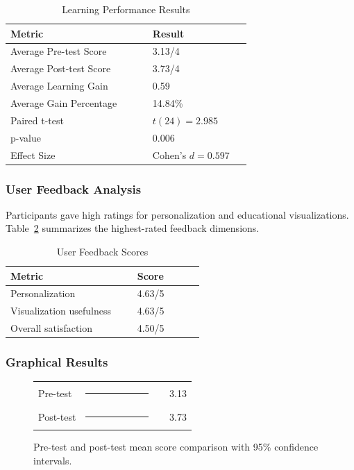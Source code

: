 \documentclass[conference]{IEEEtran}
\begin{document}
\begin{table}[htbp]
\caption{Learning Performance Results}
\label{tab:learning-performance}
\centering
\begin{tabular}{p{0.52\linewidth}p{0.36\linewidth}}
\toprule
\textbf{Metric} & \textbf{Result} \\
\midrule
Average Pre-test Score & 3.13/4 \\
Average Post-test Score & 3.73/4 \\
Average Learning Gain & 0.59 \\
Average Gain Percentage & 14.84\% \\
Paired t-test & $t(24)=2.985$ \\
p-value & 0.006 \\
Effect Size & Cohen's $d=0.597$ \\
\bottomrule
\end{tabular}
\end{table}

\subsubsection{User Feedback Analysis}

Participants gave high ratings for personalization and educational visualizations. Table~\ref{tab:user-feedback} summarizes the highest-rated feedback dimensions.

\begin{table}[htbp]
\caption{User Feedback Scores}
\label{tab:user-feedback}
\centering
\begin{tabular}{p{0.58\linewidth}p{0.30\linewidth}}
\toprule
\textbf{Metric} & \textbf{Score} \\
\midrule
Personalization & 4.63/5 \\
Visualization usefulness & 4.63/5 \\
Overall satisfaction & 4.50/5 \\
\bottomrule
\end{tabular}
\end{table}

\subsubsection{Graphical Results}

\begin{figure}[htbp]
\centering
\scriptsize
\begin{tabular}{@{}p{0.30\linewidth}p{0.46\linewidth}r@{}}
Pre-test & \rule{0.86in}{5pt}\hspace{0.05in}{\scriptsize CI: 2.67--3.60} & 3.13 \\
Post-test & \rule{1.03in}{5pt}\hspace{0.05in}{\scriptsize CI: 3.59--3.87} & 3.73 \\
\end{tabular}
\caption{Pre-test and post-test mean score comparison with 95\% confidence intervals.}
\label{fig:pre-post-ci}
\end{figure}
\end{document}
